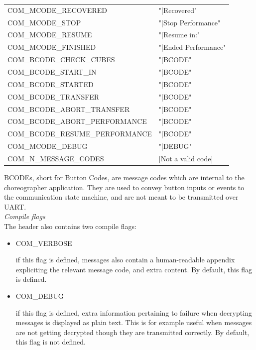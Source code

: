 \begin{table}[ht]
\begin{center}
\begin{tabular}{ll}
COM\_MCODE\_RECOVERED           & "|Recovered"         \\
COM\_MCODE\_STOP                & "|Stop Performance"  \\
COM\_MCODE\_RESUME              & "|Resume in:"        \\
COM\_MCODE\_FINISHED            & "|Ended Performance" \\
COM\_BCODE\_CHECK\_CUBES        & "|BCODE"             \\
COM\_BCODE\_START\_IN           & "|BCODE"             \\
COM\_BCODE\_STARTED             & "|BCODE"             \\
COM\_BCODE\_TRANSFER            & "|BCODE"             \\
COM\_BCODE\_ABORT\_TRANSFER     & "|BCODE"             \\
COM\_BCODE\_ABORT\_PERFORMANCE  & "|BCODE"             \\
COM\_BCODE\_RESUME\_PERFORMANCE & "|BCODE"             \\
COM\_MCODE\_DEBUG               & "|DEBUG"             \\
COM\_N\_MESSAGE\_CODES          & [Not a valid code]  \\
 \hline
\end{tabular}
\end{center}
\end{table}

BCODEs, short for Button Codes, are message codes which are internal to the choreographer application. They are used to convey button inputs or events to the communication state machine, and are not meant to be transmitted over UART.\\


\textit{Compile flags}\\

The header also contains two compile flags:\\

\begin{itemize}
\item[] COM\_VERBOSE

	if this flag is defined, messages also contain a human-readable appendix expliciting the relevant message code, and extra content. By default, this flag is defined.

\item[] COM\_DEBUG

	if this flag is defined, extra information pertaining to failure when decrypting messages is displayed as plain text. This is for example useful when messages are not getting decrypted though they are transmitted correctly. By default, this flag is not defined.
    
\end{itemize}

